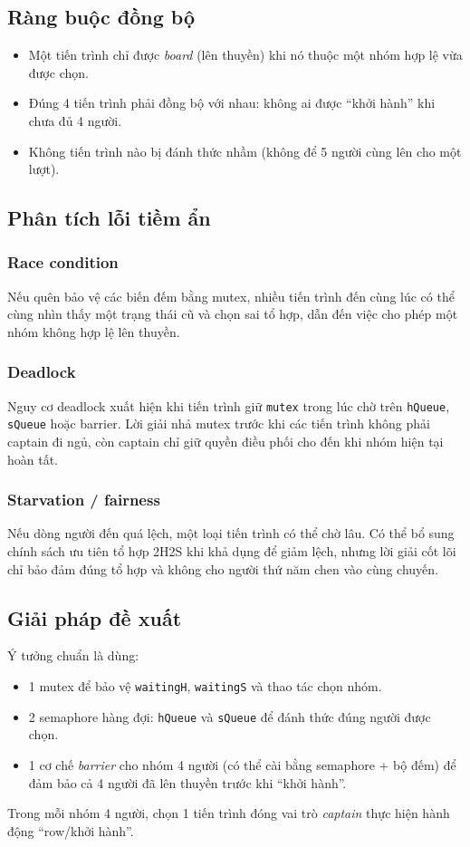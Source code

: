 \subsection{Ràng buộc đồng bộ}
\begin{itemize}
    \item Một tiến trình chỉ được \textit{board} (lên thuyền) khi nó thuộc một nhóm hợp lệ vừa được chọn.
    \item Đúng 4 tiến trình phải đồng bộ với nhau: không ai được “khởi hành” khi chưa đủ 4 người.
    \item Không tiến trình nào bị đánh thức nhầm (không để 5 người cùng lên cho một lượt).
\end{itemize}

\subsection{Phân tích lỗi tiềm ẩn}

\subsubsection*{Race condition}
Nếu quên bảo vệ các biến đếm bằng mutex, nhiều tiến trình đến cùng lúc có thể
cùng nhìn thấy một trạng thái cũ và chọn sai tổ hợp, dẫn đến việc cho phép một
nhóm không hợp lệ lên thuyền.

\subsubsection*{Deadlock}
Nguy cơ deadlock xuất hiện khi tiến trình giữ \texttt{mutex} trong lúc chờ trên
\texttt{hQueue}, \texttt{sQueue} hoặc barrier. Lời giải nhả mutex trước khi các
tiến trình không phải captain đi ngủ, còn captain chỉ giữ quyền điều phối cho
đến khi nhóm hiện tại hoàn tất.

\subsubsection*{Starvation / fairness}
Nếu dòng người đến quá lệch, một loại tiến trình có thể chờ lâu. Có thể bổ
sung chính sách ưu tiên tổ hợp 2H2S khi khả dụng để giảm lệch, nhưng lời giải
cốt lõi chỉ bảo đảm đúng tổ hợp và không cho người thứ năm chen vào cùng
chuyến.

\subsection{Giải pháp đề xuất}
Ý tưởng chuẩn là dùng:
\begin{itemize}
    \item 1 mutex để bảo vệ \texttt{waitingH}, \texttt{waitingS} và thao tác chọn nhóm.
    \item 2 semaphore hàng đợi: \texttt{hQueue} và \texttt{sQueue} để đánh thức đúng người được chọn.
    \item 1 cơ chế \textit{barrier} cho nhóm 4 người (có thể cài bằng semaphore + bộ đếm) để đảm bảo cả 4 người đã lên thuyền trước khi “khởi hành”.
\end{itemize}
Trong mỗi nhóm 4 người, chọn 1 tiến trình đóng vai trò \textit{captain} thực hiện hành động “row/khởi hành”.

